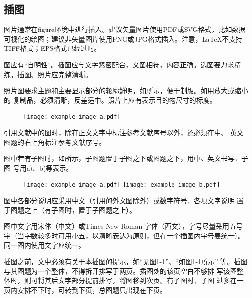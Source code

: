 \subsection{插图}
图片通常在figure环境中进行插入。建议矢量图片使用PDF或SVG格式，比如数据可视化的绘图；建议非矢量图片使用PNG或JPG格式插入。注意，\LaTeX{}不支持TIFF格式；EPS格式已经过时。

图应有“自明性”。插图应与文字紧密配合，文图相符，内容正确。选图要力求精练，插图、照片应完整清晰。

照片图要求主题和主要显示部分的轮廓鲜明，如所示，便于制版。如用放大或缩小的
复制品，必须清晰，反差适中。照片上应有表示目的物尺寸的标度。

\begin{figure}[htbp]
  \centering
  \texttt{[image: example-image-a.pdf]}
  \label{fig:eg1}
\end{figure}

引用文献中的图\cite{TUN2025LaTeXThesisTe}时，除在正文文字中标注参考文献序号以外，还必须在中、
英文图题的右上角标注参考文献序号。

图中若有子图时，如所示，子图题置于子图之下或图题之下，用中、英文书写，子图
号用a)、b)等表示。

\begin{figure}
  \centering
    {\texttt{[image: example-image-a.pdf]}}
    {\texttt{[image: example-image-b.pdf]}}
  \label{fig:eg2}
\end{figure}

图中各部分说明应采用中文（引用的外文图除外）或数字符号，各项文字说明
置于图题之上（有子图时，置于子图题之上）。

图中文字用宋体（中文）或Times New Roman 字体（西文），字号尽量采用五号字（当字数较多时可用小五，以清晰表达为原则，但在一个插图内字号要统一）。同一图内使用文字应统一。

插图之前，文中必须有关于本插图的提示，如“见图1-1”、“如图1-1所示”
等。插图与其图题为一个整体，不得拆开排写于两页。插图处的该页空白不够排
写该图整体时，则可将其后文字部分提前排写，将图移到次页。有子图时，子图
过多在一页内安排不下时，可转到下页，总图题只出现在下页。

